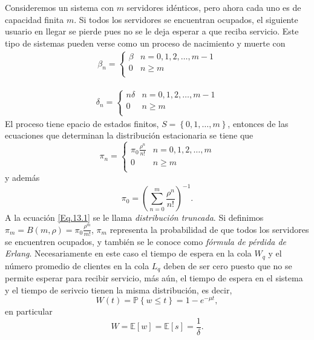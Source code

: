 \documentclass{article}
\newcommand{\esp}{\mathbb{E}}
\newcommand{\prob}{\mathbb{P}}
\begin{document}
Consideremos un sistema con $m$ servidores id\'enticos, pero ahora cada uno es de capacidad finita $m$. Si todos los servidores se encuentran ocupados, el siguiente usuario en llegar se pierde pues no se le deja esperar a que reciba servicio. Este tipo de sistemas pueden verse como un proceso de nacimiento y muerte con
\begin{eqnarray}
\beta_{n}=\left\{\begin{array}{cc}
\beta & n=0,1,2,\ldots,m-1\\
0 & n\geq m\\
\end{array}
\right.
\end{eqnarray}

\begin{eqnarray}
\delta_{n}=\left\{\begin{array}{cc}
n\delta & n=0,1,2,\ldots,m-1\\
0 & n\geq m\\
\end{array}
\right.
\end{eqnarray}
El proceso tiene epacio de estados finitos, $S=\left\{0,1,\ldots,m\right\}$, entonces de las ecuaciones que determinan la distribuci\'on estacionaria se tiene que
\begin{equation}\label{Eq.13.1}
\pi_{n}=\left\{\begin{array}{cc}
\pi_{0}\frac{\rho^{n}}{n!} & n=0,1,2,\ldots,m\\
0 & n\geq m\\
\end{array}
\right.
\end{equation}
y adem\'as
\begin{equation}
\pi_{0}=\left(\sum_{n=0}^{m}\frac{\rho^{n}}{n!}\right)^{-1}.
\end{equation}
A la ecuaci\'on \ref{Eq.13.1} se le llama {\em distribuci\'on truncada}. Si definimos
$\pi_{m}=B\left(m,\rho\right)=\pi_{0}\frac{\rho^{m}}{m!}$, $\pi_{m}$ representa la probabilidad de que todos los servidores se encuentren ocupados, y tambi\'en se le conoce como {\em f\'ormula de p\'erdida de Erlang}. Necesariamente en este caso el tiempo de espera en la cola $W_{q}$ y el n\'umero promedio de clientes en la cola $L_{q}$ deben de ser cero puesto que no se permite esperar para recibir servicio, m\'as a\'un, el tiempo de espera en el sistema y el tiempo de serivcio tienen la misma distribuci\'on, es decir,
\[W\left(t\right)=\prob\left\{w\leq t\right\}=1-e^{-\mu t},\] en particular
\[W=\esp\left[w\right]=\esp\left[s\right]=\frac{1}{\delta}.\]
\end{document}
